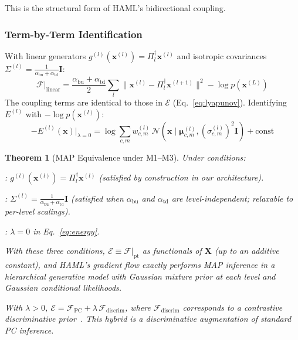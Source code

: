 \documentclass[11pt,a4paper]{article}
\newtheorem{theorem}{Theorem}[section]
\begin{document}
This is the structural form of HAML's bidirectional coupling.

\subsubsection{Term-by-Term Identification}

With linear generators $g^{(l)}(\mathbf{x}^{(l)}) = \Pi_l^\dagger \mathbf{x}^{(l)}$ and
isotropic covariances $\Sigma^{(l)} = \frac{1}{\alpha_{\mathrm{bu}}+\alpha_{\mathrm{td}}}\mathbf{I}$:
\begin{equation}
  \mathcal{F}\big|_{\mathrm{linear}} =
    \frac{\alpha_{\mathrm{bu}}+\alpha_{\mathrm{td}}}{2}
    \sum_l \|\mathbf{x}^{(l)} - \Pi_l^\dagger \mathbf{x}^{(l+1)}\|^2
    - \log p(\mathbf{x}^{(L)})
\end{equation}
The coupling terms are identical to those in $\mathcal{E}$ (Eq.~\ref{eq:lyapunov}).
Identifying $E^{(l)}$ with $-\log p(\mathbf{x}^{(l)})$:
\begin{equation}
  -E^{(l)}(\mathbf{x})\big|_{\lambda=0} =
    \log \sum_{c,m} w^{(l)}_{c,m}\,
    \mathcal{N}(\mathbf{x} \mid \boldsymbol{\mu}^{(l)}_{c,m}, (\sigma^{(l)}_{c,m})^2\mathbf{I})
    + \text{const}
\end{equation}

\begin{theorem}[MAP Equivalence under M1--M3]
\label{thm:map}
Under conditions:
\begin{description}[leftmargin=2.5em]
  \item[M1 -- Linear generators]: $g^{(l)}(\mathbf{x}^{(l)}) = \Pi_l^\dagger \mathbf{x}^{(l)}$
        (satisfied by construction in our architecture).
  \item[M2 -- Isotropic covariances]: $\Sigma^{(l)} = \frac{1}{\alpha_{\mathrm{bu}}+\alpha_{\mathrm{td}}}\mathbf{I}$
        (satisfied when $\alpha_{\mathrm{bu}}$ and $\alpha_{\mathrm{td}}$ are level-independent;
        relaxable to per-level scalings).
  \item[M3 -- No repulsion]: $\lambda = 0$ in Eq.~\ref{eq:energy}.
\end{description}
With these three conditions, $\mathcal{E} \equiv \mathcal{F}|_{\mathrm{pt}}$ as functionals
of $\mathbf{X}$ (up to an additive constant), and HAML's gradient flow exactly performs
\emph{MAP inference} in a hierarchical generative model with Gaussian mixture prior at
each level and Gaussian conditional likelihoods.

With $\lambda > 0$, $\mathcal{E} = \mathcal{F}_{\mathrm{PC}} + \lambda\,\mathcal{F}_{\mathrm{discrim}}$,
where $\mathcal{F}_{\mathrm{discrim}}$ corresponds to a contrastive discriminative
prior~\cite{larochelle2008}. This hybrid is a discriminative augmentation of standard PC
inference.
\end{theorem}
\end{document}
